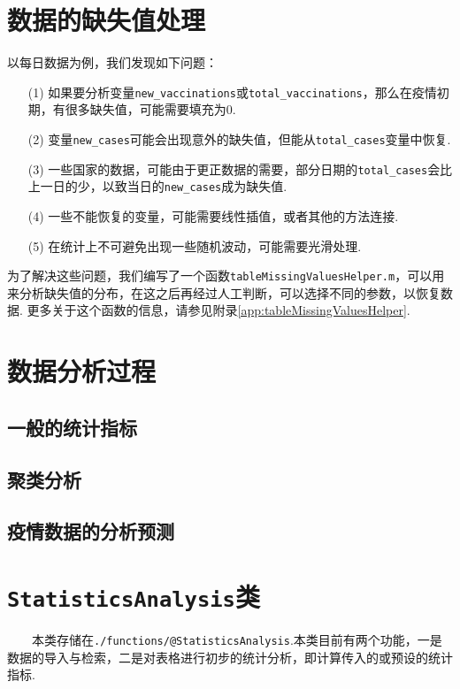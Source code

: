 \documentclass[a4paper, titlepage]{article}
\begin{document}
    \section{数据的缺失值处理}\label{数据的缺失值处理}
        以每日数据为例，我们发现如下问题：
        \begin{enumerate}
            \item [(1)] 如果要分析变量\texttt{new\_vaccinations}或\texttt{total\_vaccinations}，那么在疫情初期，有很多缺失值，可能需要填充为$0$.
            \item [(2)] 变量\texttt{new\_cases}可能会出现意外的缺失值，但能从\texttt{total\_cases}变量中恢复.
            \item [(3)] 一些国家的数据，可能由于更正数据的需要，部分日期的\texttt{total\_cases}会比上一日的少，以致当日的\texttt{new\_cases}成为缺失值.
            \item [(4)] 一些不能恢复的变量，可能需要线性插值，或者其他的方法连接.
            \item [(5)] 在统计上不可避免出现一些随机波动，可能需要光滑处理.
        \end{enumerate}
        为了解决这些问题，我们编写了一个函数\texttt{tableMissingValuesHelper.m}，可以用来分析缺失值的分布，在这之后再经过人工判断，可以选择不同的参数，以恢复数据. 更多关于这个函数的信息，请参见附录\ref{app:tableMissingValuesHelper}. 
    \section{数据分析过程}\label{数据分析}
    \subsection{一般的统计指标}\label{一般的统计指标}
    \subsection{聚类分析}
    \subsection{疫情数据的分析预测}
    \newpage
    \appendix
    \section{\texttt{StatisticsAnalysis}类}\label{app:StatisticsAnalysis}
    　　本类存储在\texttt{./functions/@StatisticsAnalysis}.本类目前有两个功能，一是数据的导入与检索，二是对表格进行初步的统计分析，即计算传入的或预设的统计指标. 
\end{document}
